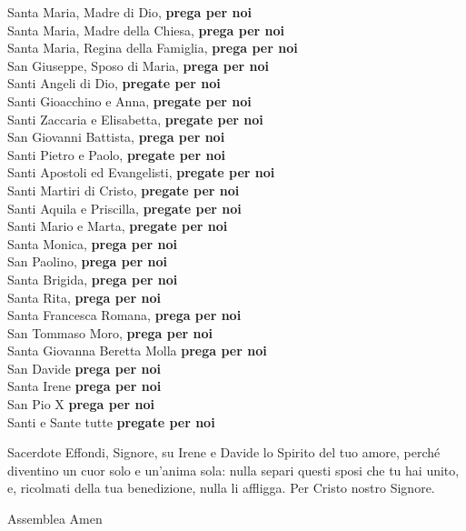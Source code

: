 \begin{dialoghi}
Santa Maria, Madre di Dio, \textbf{prega per noi}\\
Santa Maria, Madre della Chiesa, \textbf{prega per noi}\\
Santa Maria, Regina della Famiglia, \textbf{prega per noi}\\
San Giuseppe, Sposo di Maria, \textbf{prega per noi}\\
Santi Angeli di Dio, \textbf{pregate per noi}\\
Santi Gioacchino e Anna, \textbf{pregate per noi}\\
Santi Zaccaria e Elisabetta, \textbf{pregate per noi}\\
San Giovanni Battista, \textbf{prega per noi}\\
Santi Pietro e Paolo, \textbf{pregate per noi}\\
Santi Apostoli ed Evangelisti, \textbf{pregate per noi}\\
Santi Martiri di Cristo, \textbf{pregate per noi}\\
Santi Aquila e Priscilla, \textbf{pregate per noi}\\
Santi Mario e Marta, \textbf{pregate per noi}\\
Santa Monica, \textbf{prega per noi}\\
San Paolino, \textbf{prega per noi}\\
Santa Brigida, \textbf{prega per noi}\\
Santa Rita, \textbf{prega per noi}\\
Santa Francesca Romana, \textbf{prega per noi}\\
San Tommaso Moro, \textbf{prega per noi}\\
Santa Giovanna Beretta Molla \textbf{prega per noi}\\
San Davide \textbf{prega per noi}\\
Santa Irene \textbf{prega per noi}\\
San Pio X \textbf{prega per noi}\\
Santi e Sante tutte \textbf{pregate per noi}
\item[Sacerdote] Effondi, Signore, su Irene e Davide lo Spirito del tuo amore, perché diventino un cuor solo e un'anima sola: nulla separi questi sposi che tu hai unito, e, ricolmati della tua benedizione, nulla li affligga. Per Cristo nostro Signore.
\item[Assemblea] Amen
\end{dialoghi}
